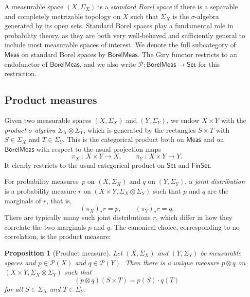 \documentclass[11pt,a4paper]{scrartcl}
\newcommand{\setc}{\mathsf{Set}}
\newcommand{\finset}{\mathsf{FinSet}}
\newcommand{\meas}{\mathsf{Meas}}
\newcommand{\borelmeas}{\mathsf{BorelMeas}}
\newcommand{\giry}{\mathcal{P}}
\newtheorem{prop}[theo]{Proposition}
\theoremstyle{definition}
\begin{document}
A measurable space $(X,\Sigma_X)$ is a \emph{standard Borel space} if there is a separable and completely metrizable topology on $X$ such that $\Sigma_X$ is the $\sigma$-algebra generated by its open sets.
Standard Borel spaces play a fundamental role in probability theory, as they are both very well-behaved and sufficiently general to include most measurable spaces of interest.
We denote the full subcategory of $\meas$ on standard Borel spaces by $\borelmeas$.
The Giry functor restricts to an endofunctor of $\borelmeas$, and we also write $\giry: \borelmeas \rightarrow \setc$ for this restriction.

\subsection{Product measures}

Given two measurable spaces $(X,\Sigma_X)$ and $(Y,\Sigma_Y)$, we endow $X \times Y$ with the \emph{product $\sigma$-algebra} $\Sigma_X \otimes \Sigma_Y$,
which is generated by the rectangles $S \times T$ with $S \in \Sigma_X$ and $T \in \Sigma_Y$.
This is the categorical product both on $\meas$ and on $\borelmeas$ with respect to the usual projection maps
\[
	  \pi_X \: : \: X \times Y \longrightarrow X, \qquad
	  \pi_Y \: : \: X \times Y \longrightarrow Y.
\]
It clearly restricts to the usual categorical product on $\setc$ and $\finset$.

For probability measures~$p$ on $(X,\Sigma_X)$ and $q$ on $(Y,\Sigma_Y)$, a \emph{joint distribution} is a probability measure $r$ on $(X \times Y, \Sigma_X \otimes \Sigma_Y)$ such that $p$ and $q$ are the marginals of $r$, that is, 
\[
	(\pi_X)_\ast r = p, \qquad (\pi_Y)_\ast r = q.
\]
There are typically many such joint distributions $r$, which differ in how they correlate the two marginals $p$ and $q$.
The canonical choice, corresponding to no correlation, is the product measure:

\begin{prop}[Product measure] \label{defi:productmeasure}
  Let $(X,\Sigma_X)$ and $(Y,\Sigma_Y)$ be measurable spaces and $p \in \giry(X)$ and $q \in \giry(Y)$.
  Then there is a unique measure $p \otimes q$ on $(X \times Y, \Sigma_X \otimes \Sigma_Y)$ such that
  \begin{equation}
    \label{eq:productmeasure}
    (p \otimes q) (S \times T) = p(S) \cdot q(T)
  \end{equation}
  for all $S \in \Sigma_X$ and $T \in \Sigma_Y$.
\end{prop}
\end{document}
